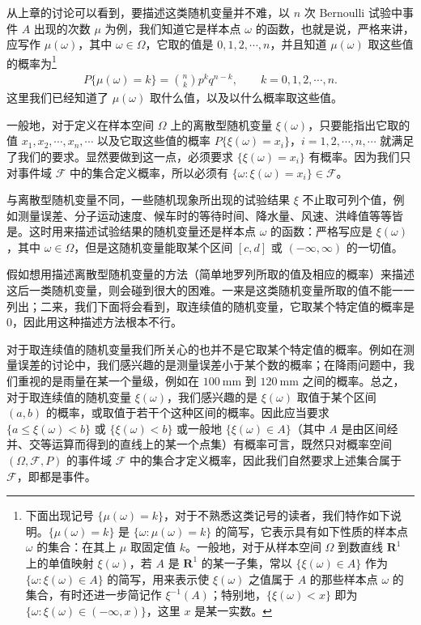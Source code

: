 \documentclass[../../main.tex]{subfiles}
\begin{document}
从上章的讨论可以看到，要描述这类随机变量并不难，以 $n$ 次 Bernoulli 试验中事件 $A$ 出现的次数 $\mu$ 为例，我们知道它是样本点 $\omega$ 的函数，也就是说，严格来讲，应写作 $\mu(\omega)$，其中 $\omega\in\Omega$，它取的值是 $0,1,2,\cdots,n$，并且知道 $\mu(\omega)$ 取这些值的概率为\footnote{下面出现记号 $\{\mu(\omega)=k\}$，对于不熟悉这类记号的读者，我们特作如下说明。$\{\mu(\omega)=k\}$ 是 $\{\omega:\mu(\omega)=k\}$ 的简写，它表示具有如下性质的样本点 $\omega$ 的集合：在其上 $\mu$ 取固定值 $k$。一般地，对于从样本空间 $\Omega$ 到数直线 $\mathbf{R}^{1}$ 上的单值映射 $\xi(\omega)$，若 $A$ 是 $\mathbf{R}^{1}$ 的某一子集，常以 $\{\xi(\omega)\in A\}$ 作为 $\{\omega:\xi(\omega)\in A\}$ 的简写，用来表示使 $\xi(\omega)$ 之值属于 $A$ 的那些样本点 $\omega$ 的集合，有时还进一步简记作 $\xi^{-1}(A)$；特别地，$\{\xi(\omega)<x\}$ 即为 $\{\omega:\xi(\omega)\in(-\infty,x)\}$，这里 $x$ 是某一实数。}
\begin{align}
P\{\mu(\omega)=k\}=\binom{n}{k}p^{k}q^{n-k},\qquad k=0,1,2,\cdots,n.\label{align:ch03-二项分布概率}
\end{align}
这里我们已经知道了 $\mu(\omega)$ 取什么值，以及以什么概率取这些值。

一般地，对于定义在样本空间 $\Omega$ 上的离散型随机变量 $\xi(\omega)$，只要能指出它取的值 $x_1,x_2,\cdots,x_n,\cdots$ 以及它取这些值的概率 $P\{\xi(\omega)=x_i\}$，$i=1,2,\cdots,n,\cdots$ 就满足了我们的要求。显然要做到这一点，必须要求 $\{\xi(\omega)=x_i\}$ 有概率。因为我们只对事件域 $\mathscr{F}$ 中的集合定义概率，所以必须有 $\{\omega:\xi(\omega)=x_i\}\in\mathscr{F}$。

与离散型随机变量不同，一些随机现象所出现的试验结果 $\xi$ 不止取可列个值，例如测量误差、分子运动速度、候车时的等待时间、降水量、风速、洪峰值等等皆是。这时用来描述试验结果的随机变量还是样本点 $\omega$ 的函数：严格写应是 $\xi(\omega)$，其中 $\omega\in\Omega$，但是这随机变量能取某个区间 $[c,d]$ 或 $(-\infty,\infty)$ 的一切值。

假如想用描述离散型随机变量的方法（简单地罗列所取的值及相应的概率）来描述这后一类随机变量，则会碰到很大的困难。一来是这类随机变量所取的值不能一一列出；二来，我们下面将会看到，取连续值的随机变量，它取某个特定值的概率是 $0$，因此用这种描述方法根本不行。

对于取连续值的随机变量我们所关心的也并不是它取某个特定值的概率。例如在测量误差的讨论中，我们感兴趣的是测量误差小于某个数的概率；在降雨问题中，我们重视的是雨量在某一个量级，例如在 $100\ \mathrm{mm}$ 到 $120\ \mathrm{mm}$ 之间的概率。总之，对于取连续值的随机变量 $\xi(\omega)$，我们感兴趣的是 $\xi(\omega)$ 取值于某个区间 $(a,b)$ 的概率，或取值于若干个这种区间的概率。因此应当要求 $\{a\leqslant\xi(\omega)<b\}$ 或 $\{\xi(\omega)<b\}$ 或一般地 $\{\xi(\omega)\in A\}$（其中 $A$ 是由区间经并、交等运算而得到的直线上的某一个点集）有概率可言，既然只对概率空间 $(\Omega,\mathscr{F},P)$ 的事件域 $\mathscr{F}$ 中的集合才定义概率，因此我们自然要求上述集合属于 $\mathscr{F}$，即都是事件。
\end{document}
